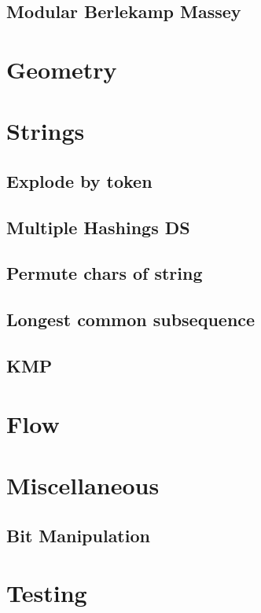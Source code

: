 \subsection{Modular Berlekamp Massey}

\section{Geometry}


\section{Strings}
\subsection{Explode by token}
\subsection{Multiple Hashings DS}
\subsection{Permute chars of string}
\subsection{Longest common subsequence}
\subsection{KMP}


\section{Flow}


\section{Miscellaneous}

\subsection{Bit Manipulation}

\section{Testing}






